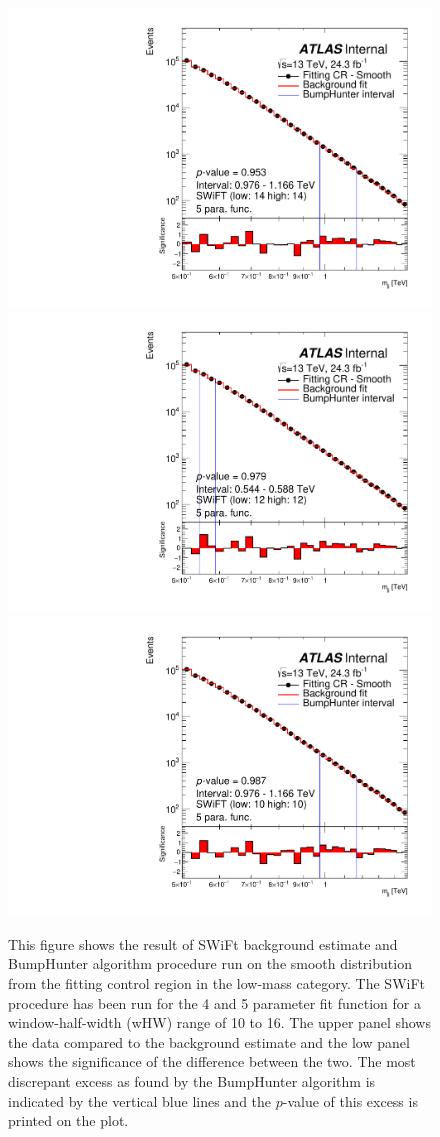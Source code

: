 \begin{figure}[!htb]
{}
 {
  \includegraphics[width=0.3\linewidth, angle=0]{figs/Dibjet/LowMass/FitStudy/bhFit_corrFitCR_smooth_5para_low14_high14.pdf}
}
 {
  \includegraphics[width=0.3\linewidth, angle=0]{figs/Dibjet/LowMass/FitStudy/bhFit_corrFitCR_smooth_5para_low12_high12.pdf}
}
 {
  \includegraphics[width=0.3\linewidth, angle=0]{figs/Dibjet/LowMass/FitStudy/bhFit_corrFitCR_smooth_5para_low10_high10.pdf}
}
\vspace{10pt}
\caption{\label{fig:app-bhFit_lm_corrFitCR_smooth}
  This figure shows the result of SWiFt background estimate and {\sc BumpHunter} algorithm procedure run on the smooth distribution from the fitting control region in the low-mass category.
  The SWiFt procedure has been run for the 4 and 5 parameter fit function for a window-half-width (wHW) range of 10 to 16.
  The upper panel shows the data compared to the background estimate and the low panel shows the significance of the difference between the two.
  The most discrepant excess as found by the {\sc BumpHunter} algorithm is indicated by the vertical blue lines and the $p$-value of this excess is printed on the plot. }
\end{figure}



